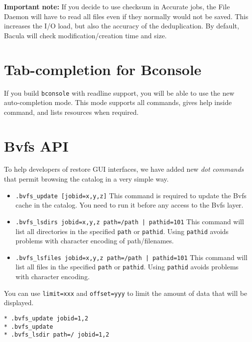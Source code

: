\textbf{Important note:} If you decide to use checksum in Accurate jobs,
the File Daemon will have to read all files even if they normally would not
be saved.  This increases the I/O load, but also the accuracy of the
deduplication.  By default, Bacula will check modification/creation time
and size.

\section{Tab-completion for Bconsole}
\label{sec:tabcompletion}

If you build \texttt{bconsole} with readline support, you will be able to use
the new auto-completion mode. This mode supports all commands, gives help
inside command, and lists resources when required.

\section{Bvfs API}
\label{sec:bvfs}

To help developers of restore GUI interfaces, we have added new \textsl{dot
  commands} that permit browsing the catalog in a very simple way.

\begin{itemize}
\item \texttt{.bvfs\_update [jobid=x,y,z]} This command is required to update the
  Bvfs cache in the catalog. You need to run it before any access to the Bvfs
  layer.

\item \texttt{.bvfs\_lsdirs jobid=x,y,z path=/path | pathid=101} This command
  will list all directories in the specified \texttt{path} or
  \texttt{pathid}. Using \texttt{pathid} avoids problems with character
  encoding of path/filenames.

\item \texttt{.bvfs\_lsfiles jobid=x,y,z path=/path | pathid=101} This command
  will list all files in the specified \texttt{path} or \texttt{pathid}. Using
  \texttt{pathid} avoids problems with character encoding.
\end{itemize}

You can use \texttt{limit=xxx} and \texttt{offset=yyy} to limit the amount of
data that will be displayed.

\begin{verbatim}
* .bvfs_update jobid=1,2
* .bvfs_update
* .bvfs_lsdir path=/ jobid=1,2
\end{verbatim}

